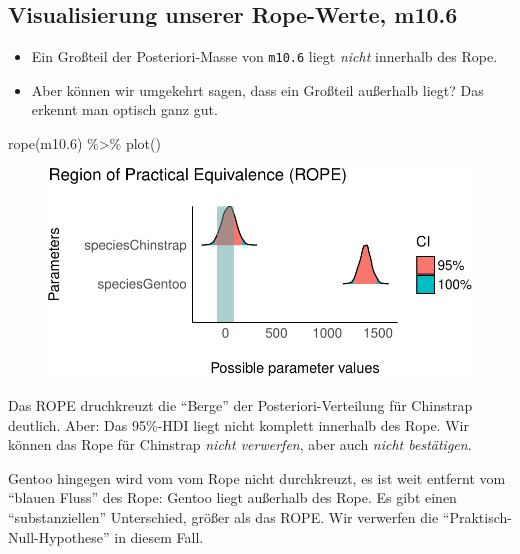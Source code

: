 \documentclass[
  a4paper,
  DIV=11]{scrreprt}
\newenvironment{Shaded}{\begin{snugshade}}{\end{snugshade}}
\newcommand{\FloatTok}[1]{\textcolor[rgb]{0.68,0.00,0.00}{#1}}
\newcommand{\FunctionTok}[1]{\textcolor[rgb]{0.28,0.35,0.67}{#1}}
\newcommand{\NormalTok}[1]{\textcolor[rgb]{0.00,0.23,0.31}{#1}}
\newcommand{\SpecialCharTok}[1]{\textcolor[rgb]{0.37,0.37,0.37}{#1}}
\providecommand{\tightlist}{%
  \setlength{\itemsep}{0pt}\setlength{\parskip}{0pt}}\usepackage{longtable,booktabs,array}
\theoremstyle{definition}
\theoremstyle{remark}
\begin{document}
\hypertarget{visualisierung-unserer-rope-werte-m10.6}{%
\subsection{Visualisierung unserer Rope-Werte,
m10.6}\label{visualisierung-unserer-rope-werte-m10.6}}

\begin{itemize}
\tightlist
\item
  Ein Großteil der Posteriori-Masse von \texttt{m10.6} liegt
  \emph{nicht} innerhalb des Rope.
\item
  Aber können wir umgekehrt sagen, dass ein Großteil außerhalb liegt?
  Das erkennt man optisch ganz gut.
\end{itemize}

\begin{Shaded}
\begin{Highlighting}[]
\FunctionTok{rope}\NormalTok{(m10}\FloatTok{.6}\NormalTok{) }\SpecialCharTok{\%\textgreater{}\%} \FunctionTok{plot}\NormalTok{()}
\end{Highlighting}
\end{Shaded}

\begin{figure}[H]

{\centering \includegraphics{./metrische-AV_files/figure-pdf/unnamed-chunk-35-1.pdf}

}

\end{figure}

Das ROPE druchkreuzt die ``Berge'' der Posteriori-Verteilung für
Chinstrap deutlich. Aber: Das 95\%-HDI liegt nicht komplett innerhalb
des Rope. Wir können das Rope für Chinstrap \emph{nicht verwerfen}, aber
auch \emph{nicht bestätigen}.

Gentoo hingegen wird vom vom Rope nicht durchkreuzt, es ist weit
entfernt vom ``blauen Fluss'' des Rope: Gentoo liegt außerhalb des Rope.
Es gibt einen ``substanziellen'' Unterschied, größer als das ROPE. Wir
verwerfen die ``Praktisch-Null-Hypothese'' in diesem Fall.
\end{document}

